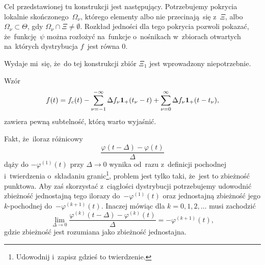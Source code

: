 \documentclass[a4paper,11pt]{article}
\begin{document}
\vspace{\spaceFour}





\start {} Cel przedstawionej tu konstrukcji jest następujący.
Potrzebujemy pokrycia lokalnie skończonego~$\Omega_{ \nu }$, którego
elementy albo nie przecinają~się z~$\Xi$, albo
$\Omega_{ \nu } \subset \Theta$, gdy $\Omega_{ \nu } \cap \Xi \neq \emptyset$.
Rozkład jedności dla tego pokrycia pozwoli pokazać, że~funkcję~$\psi$
można rozłożyć na~funkcje o~nośnikach w~zbiorach otwartych na~których
dystrybucja $f$~jest równa $0$.

Wydaje mi~się, że~do tej konstrukcji zbiór $\Xi_{ 1 }$ jest
wprowadzony niepotrzebnie.

\vspace{\spaceFour}



\start {}

\vspace{\spaceFour}



\start {}

\vspace{\spaceFour}



\start {} Wzór
\begin{equation}
  \label{eq:Zemanian-07}
  f( t ) =
  f_{ c }( t )
  - \sum_{ \nu = -1 }^{ -\infty } \Delta f_{ \nu } \mathbf{1}_{ + }( t_{ \nu } - t )
  + \sum_{ \nu = 0 }^{ \infty } \Delta f_{ \nu } \mathbf{1}_{ + }( t - t_{ \nu } ),
\end{equation}
zawiera pewną subtelność, którą warto wyjaśnić. \Dok

\vspace{\spaceFour}





\start {} Fakt, że~iloraz różnicowy
\begin{equation}
  \label{eq:Zemanian-08}
  \frac{ \varphi( t - \Delta ) - \varphi( t ) }{ \Delta }
\end{equation}
dąży do $-\varphi^{ ( 1 ) }( t )$ przy $\Delta \to 0$ wynika od~razu z~definicji
pochodnej i~twierdzenia o~składaniu granic\footnote{Udowodnij i~zapisz
  gdzieś to twierdzenie.}, problem jest tylko taki, że~jest to
zbieżność punktowa. Aby zaś skorzystać z~ciągłości dystrybucji
potrzebujemy udowodnić zbieżność jednostajną tego ilorazy
do~$-\varphi^{ ( 1 ) }( t )$ oraz jednostajną zbieżność jego $k$-pochodnej
do~$-\varphi^{ ( k + 1 ) }( t )$. Inaczej mówiąc dla $k = 0, 1, 2, \ldots$
musi zachodzić
\begin{equation}
  \label{eq:Zemanian-09}
  \lim_{ \Delta \to 0 }
  \frac{ \varphi^{ ( k ) }( t - \Delta ) - \varphi^{ ( k ) }( t ) }{ \Delta } =
  -\varphi^{ ( k + 1 ) }( t ),
\end{equation}
gdzie zbieżność jest rozumiana jako zbieżność jednostajna.
\end{document}
